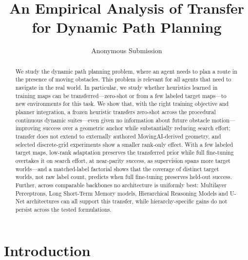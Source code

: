 \documentclass[letterpaper]{article} %
\title{An Empirical Analysis of Transfer for Dynamic Path Planning}
\author{
    Anonymous Submission
}
\begin{document}
\maketitle

\begin{abstract}
We study the dynamic path planning problem, where an agent needs to plan a route in the presence of moving obstacles. This problem is relevant for all agents that need to navigate in the real world. In particular, we study whether heuristics learned in training maps can be transferred---zero-shot or from a few labeled target maps---to new environments for this task. We show that, with the right training objective and planner integration, a frozen heuristic transfers zero-shot across the procedural continuous dynamic suites---even given no information about future obstacle motion---improving success over a geometric anchor while substantially reducing search effort; transfer does not extend to externally authored MovingAI-derived geometry, and selected discrete-grid experiments show a smaller rank-only effect. With a few labeled target maps, low-rank adaptation preserves the transferred prior while full fine-tuning overtakes it on search effort, at near-parity success, as supervision spans more target worlds---and a matched-label factorial shows that the coverage of distinct target worlds, not raw label count, predicts when full fine-tuning preserves held-out success. Further, across comparable backbones no architecture is uniformly best: Multilayer Perceptrons, Long Short-Term Memory models, Hierarchical Reasoning Models and U-Net architectures can all support this transfer, while hierarchy-specific gains do not persist across the tested formulations.
\end{abstract}


\section{Introduction}
\end{document}
